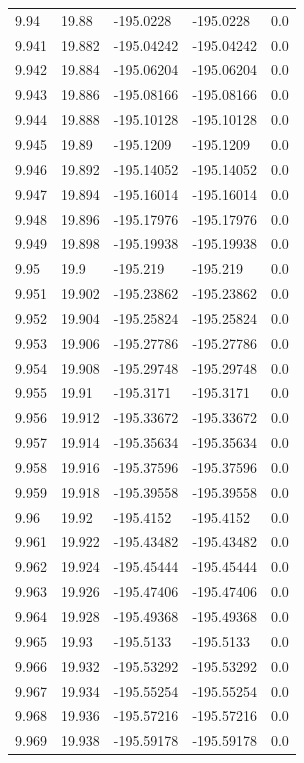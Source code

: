 \begin{tabular}{lllll}
9.94 & 19.88 & -195.0228 & -195.0228 & 0.0 \\
9.941 & 19.882 & -195.04242 & -195.04242 & 0.0 \\
9.942 & 19.884 & -195.06204 & -195.06204 & 0.0 \\
9.943 & 19.886 & -195.08166 & -195.08166 & 0.0 \\
9.944 & 19.888 & -195.10128 & -195.10128 & 0.0 \\
9.945 & 19.89 & -195.1209 & -195.1209 & 0.0 \\
9.946 & 19.892 & -195.14052 & -195.14052 & 0.0 \\
9.947 & 19.894 & -195.16014 & -195.16014 & 0.0 \\
9.948 & 19.896 & -195.17976 & -195.17976 & 0.0 \\
9.949 & 19.898 & -195.19938 & -195.19938 & 0.0 \\
9.95 & 19.9 & -195.219 & -195.219 & 0.0 \\
9.951 & 19.902 & -195.23862 & -195.23862 & 0.0 \\
9.952 & 19.904 & -195.25824 & -195.25824 & 0.0 \\
9.953 & 19.906 & -195.27786 & -195.27786 & 0.0 \\
9.954 & 19.908 & -195.29748 & -195.29748 & 0.0 \\
9.955 & 19.91 & -195.3171 & -195.3171 & 0.0 \\
9.956 & 19.912 & -195.33672 & -195.33672 & 0.0 \\
9.957 & 19.914 & -195.35634 & -195.35634 & 0.0 \\
9.958 & 19.916 & -195.37596 & -195.37596 & 0.0 \\
9.959 & 19.918 & -195.39558 & -195.39558 & 0.0 \\
9.96 & 19.92 & -195.4152 & -195.4152 & 0.0 \\
9.961 & 19.922 & -195.43482 & -195.43482 & 0.0 \\
9.962 & 19.924 & -195.45444 & -195.45444 & 0.0 \\
9.963 & 19.926 & -195.47406 & -195.47406 & 0.0 \\
9.964 & 19.928 & -195.49368 & -195.49368 & 0.0 \\
9.965 & 19.93 & -195.5133 & -195.5133 & 0.0 \\
9.966 & 19.932 & -195.53292 & -195.53292 & 0.0 \\
9.967 & 19.934 & -195.55254 & -195.55254 & 0.0 \\
9.968 & 19.936 & -195.57216 & -195.57216 & 0.0 \\
9.969 & 19.938 & -195.59178 & -195.59178 & 0.0 \\

\end{tabular}
